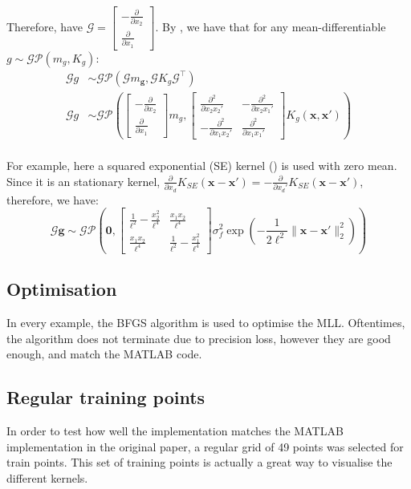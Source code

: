 \documentclass[12pt,a4paper,twoside]{report}
\theoremstyle{definition}
\begin{document}
Therefore, have $\mathscr G = \begin{bmatrix} -\frac{\partial}{\partial x_2}\\\frac{\partial}{\partial x_1} \end{bmatrix} $. By , we have that for any mean-differentiable $g\sim \mathcal {GP}(m_ g, K_ g)$:
\begin{align*}
	\mathscr G  g &\sim \mathcal {GP}\left( \mathscr G m_\mathbf g, \mathscr G K_ g \mathscr G^\top \right)\\
	\mathscr G g &\sim \mathcal {GP}\left( 
	\begin{bmatrix} -\frac{\partial}{\partial x_2}\\\frac{\partial}{\partial x_1} \end{bmatrix} m_g, 
		\begin{bmatrix} \frac{\partial^2}{\partial x_2 x_2'} & - \frac{\partial ^2}{\partial x_2x_1'}\\-\frac{\partial^2}{\partial x_1 x_2'} & \frac{\partial ^2}{\partial x_1 x_1'} \end{bmatrix} K_g(\mathbf x,\mathbf x') 
\right)\\
\end{align*}

For example, here a squared exponential (SE) kernel () is used with zero mean. Since it is an stationary kernel, $\frac{\partial}{\partial x_d} K_{SE}(\mathbf x- \mathbf x') = -\frac{\partial}{\partial x_d'}K_{SE}(\mathbf x-\mathbf x')$, therefore, we have:
$$\mathscr G \mathbf g \sim \mathcal {GP}\left( \mathbf 0, \begin{bmatrix} \frac{1}{\ell^2}-\frac{x_2^2}{\ell^4} & \frac{x_1x_2}{\ell^4}\\ \frac{x_1x_2}{\ell^4} & \frac{1}{\ell^2}-\frac{x_1^2}{\ell^4} \end{bmatrix} \sigma_f^2 \exp\left( -\frac{1}{2\ell^2}\|\mathbf x-\mathbf x'\|_2^2 \right)  \right) $$

\subsection{Optimisation}
In every example, the BFGS algorithm is used to optimise the MLL. Oftentimes, the algorithm does not terminate due to precision loss, however they are good enough, and match the MATLAB code.

\subsection{Regular training points}
In order to test how well the implementation matches the MATLAB implementation in the original paper, a regular grid of 49 points was selected for train points. This set of training points is actually a great way to visualise the different kernels. 
\end{document}
